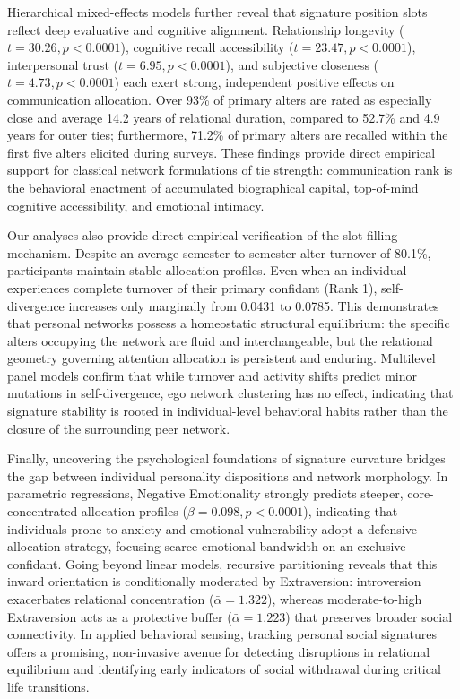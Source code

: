 \documentclass[11pt,letterpaper]{article}
\begin{document}
Hierarchical mixed-effects models further reveal that signature position slots reflect deep evaluative and cognitive alignment. Relationship longevity ($t = 30.26, p < 0.0001$), cognitive recall accessibility ($t = 23.47, p < 0.0001$), interpersonal trust ($t = 6.95, p < 0.0001$), and subjective closeness ($t = 4.73, p < 0.0001$) each exert strong, independent positive effects on communication allocation. Over 93\% of primary alters are rated as especially close and average 14.2 years of relational duration, compared to 52.7\% and 4.9 years for outer ties; furthermore, 71.2\% of primary alters are recalled within the first five alters elicited during surveys. These findings provide direct empirical support for classical network formulations of tie strength:\cite{granovetter1973strength,marsden1984measuring-f62,burt2000decay-f08} communication rank is the behavioral enactment of accumulated biographical capital, top-of-mind cognitive accessibility, and emotional intimacy.

Our analyses also provide direct empirical verification of the slot-filling mechanism. Despite an average semester-to-semester alter turnover of 80.1\%, participants maintain stable allocation profiles. Even when an individual experiences complete turnover of their primary confidant (Rank 1), self-divergence increases only marginally from 0.0431 to 0.0785. This demonstrates that personal networks possess a homeostatic structural equilibrium: the specific alters occupying the network are fluid and interchangeable, but the relational geometry governing attention allocation is persistent and enduring.\cite{fiske2004four-0f8} Multilevel panel models confirm that while turnover and activity shifts predict minor mutations in self-divergence, ego network clustering has no effect, indicating that signature stability is rooted in individual-level behavioral habits rather than the closure of the surrounding peer network.

Finally, uncovering the psychological foundations of signature curvature bridges the gap between individual personality dispositions\cite{mccrae2008empirical} and network morphology. In parametric regressions, Negative Emotionality strongly predicts steeper, core-concentrated allocation profiles ($\beta = 0.098, p < 0.0001$), indicating that individuals prone to anxiety and emotional vulnerability adopt a defensive allocation strategy, focusing scarce emotional bandwidth on an exclusive confidant. Going beyond linear models, recursive partitioning reveals that this inward orientation is conditionally moderated by Extraversion: introversion exacerbates relational concentration ($\bar{\alpha} = 1.322$), whereas moderate-to-high Extraversion acts as a protective buffer ($\bar{\alpha} = 1.223$) that preserves broader social connectivity. In applied behavioral sensing, tracking personal social signatures offers a promising, non-invasive avenue for detecting disruptions in relational equilibrium and identifying early indicators of social withdrawal during critical life transitions.
\end{document}
